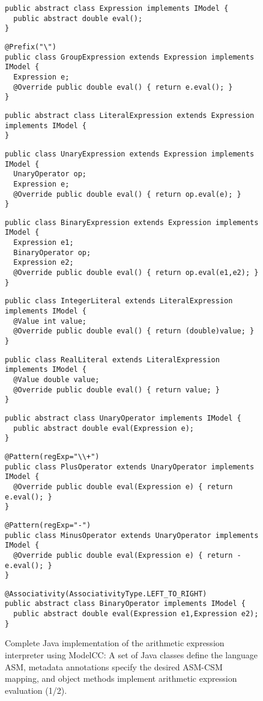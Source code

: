 \documentclass[preprint]{elsarticle}
\newcommand{\sepv}{\vspace{-6.0mm}}
\begin{document}
\begin{figure*}[p!]
\begin{verbatim}
public abstract class Expression implements IModel {
  public abstract double eval();
}
\end{verbatim}
\sepv
\begin{verbatim}
@Prefix("\")
public class GroupExpression extends Expression implements IModel {
  Expression e;
  @Override public double eval() { return e.eval(); }
}
\end{verbatim}
\sepv
\begin{verbatim}
public abstract class LiteralExpression extends Expression implements IModel {
}
\end{verbatim}
\sepv
\begin{verbatim}
public class UnaryExpression extends Expression implements IModel {
  UnaryOperator op;
  Expression e;
  @Override public double eval() { return op.eval(e); }
}
\end{verbatim}
\sepv
\begin{verbatim}
public class BinaryExpression extends Expression implements IModel {
  Expression e1;
  BinaryOperator op;
  Expression e2;
  @Override public double eval() { return op.eval(e1,e2); }
}
\end{verbatim}
\sepv
\begin{verbatim}
public class IntegerLiteral extends LiteralExpression implements IModel {
  @Value int value;
  @Override public double eval() { return (double)value; }
}
\end{verbatim}
\sepv
\begin{verbatim}
public class RealLiteral extends LiteralExpression implements IModel {
  @Value double value;
  @Override public double eval() { return value; }
}
\end{verbatim}
\sepv
\begin{verbatim}
public abstract class UnaryOperator implements IModel {
  public abstract double eval(Expression e);
}
\end{verbatim}
\sepv
\begin{verbatim}
@Pattern(regExp="\\+")
public class PlusOperator extends UnaryOperator implements IModel {
  @Override public double eval(Expression e) { return e.eval(); }
}
\end{verbatim}
\sepv
\begin{verbatim}
@Pattern(regExp="-")
public class MinusOperator extends UnaryOperator implements IModel {
  @Override public double eval(Expression e) { return -e.eval(); }
}
\end{verbatim}
\sepv
\begin{verbatim}
@Associativity(AssociativityType.LEFT_TO_RIGHT)
public abstract class BinaryOperator implements IModel {
  public abstract double eval(Expression e1,Expression e2);
}
\end{verbatim}
\caption{Complete Java implementation of the arithmetic expression interpreter using ModelCC: A set of Java classes define the language ASM,
metadata annotations specify the desired ASM-CSM mapping, and object methods implement arithmetic expression evaluation (1/2).}
\label{fig:calcimmodelcc1}
\end{figure*}
\end{document}
